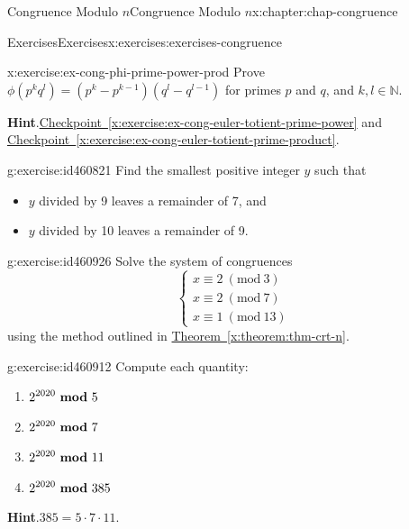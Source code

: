 \documentclass[oneside,10pt,]{book}
\newcommand{\blocktitlefont}{\relax}
\newcommand{\xreffont}{\relax}
\numberwithin{equation}{section}
\newcommand{\Mod}[1]{\ \left(\mathrm{mod}\ #1\right)}
\newcommand{\mmod}[1]{\ \mathrm{\bf mod}\ #1}
\begin{document}
\begin{chapterptx}{Congruence Modulo \(n\)}{}{Congruence Modulo \(n\)}{}{}{x:chapter:chap-congruence}
\begin{exercises-section}{Exercises}{}{Exercises}{}{}{x:exercises:exercises-congruence}
\begin{divisionexercise}{16}{}{}{x:exercise:ex-cong-phi-prime-power-prod}
Prove \(\phi(p^kq^l) = \left(p^k-p^{k-1}\right)\left(q^l - q^{l-1}\right)\) for primes \(p\) and \(q\), and \(k,l\in\mathbb{N}\).%
\par\smallskip%
\noindent\textbf{\blocktitlefont Hint}.\hypertarget{g:hint:id460806}{}\quad{}\hyperref[x:exercise:ex-cong-euler-totient-prime-power]{Checkpoint~{\xreffont\ref{x:exercise:ex-cong-euler-totient-prime-power}}} and \hyperref[x:exercise:ex-cong-euler-totient-prime-product]{Checkpoint~{\xreffont\ref{x:exercise:ex-cong-euler-totient-prime-product}}}.%
\end{divisionexercise}%
\begin{divisionexercise}{17}{}{}{g:exercise:id460821}%
Find the smallest positive integer \(y\) such that%
\begin{itemize}[label=\textbullet]
\item{}\(y\) divided by 9 leaves a remainder of 7, and%
\item{}\(y\) divided by 10 leaves a remainder of 9.%
\end{itemize}
%
\end{divisionexercise}%
\begin{divisionexercise}{18}{}{}{g:exercise:id460926}%
Solve the system of congruences%
\begin{equation*}
\begin{cases} x \equiv 2 \Mod{3} \\
x \equiv 2 \Mod{7} \\
x \equiv 1 \Mod{13} \end{cases}
\end{equation*}
using the method outlined in \hyperref[x:theorem:thm-crt-n]{Theorem~{\xreffont\ref{x:theorem:thm-crt-n}}}.%
\end{divisionexercise}%
\begin{divisionexercise}{19}{}{}{g:exercise:id460912}%
Compute each quantity:%
\begin{enumerate}[label=(\alph*)]
\item{}\(\displaystyle 2^{2020} \mmod{5}\)%
\item{}\(\displaystyle 2^{2020} \mmod{7}\)%
\item{}\(\displaystyle 2^{2020} \mmod{11}\)%
\item{}\(\displaystyle 2^{2020} \mmod{385}\)%
\end{enumerate}
%
\par\smallskip%
\noindent\textbf{\blocktitlefont Hint}.\hypertarget{g:hint:id461022}{}\quad{}\(385 = 5 \cdot 7 \cdot 11\).%
\end{divisionexercise}%
\end{exercises-section}
\end{chapterptx}
\end{document}
